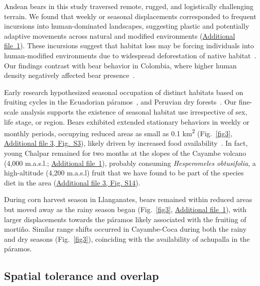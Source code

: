 \documentclass[lineno,referee,pdflatex,sn-vancouver-num]{sn-jnl}%
\theoremstyle{thmstyleone}%
\theoremstyle{thmstyletwo}%
\theoremstyle{thmstylethree}%
\begin{document}
Andean bears in this study traversed remote, rugged, and logistically challenging
terrain. We found that weekly or seasonal displacements corresponded to frequent
incursions into human-dominated landscapes, suggesting
plastic and potentially adaptive movements across natural and modified environments
(\hyperref[S1_File]{Additional file~1}). These incursions suggest that habitat loss may be forcing
individuals into human-modified environments due to widespread deforestation
of native
habitat~\cite{garcia-rangelAndeanBearTremarctos2012,kattanRangeFragmentationSpectacled2004}.
Our findings contrast with bear behavior in Colombia, where higher human density
negatively affected bear presence~\cite{gonzalez-mayaTrueHighlanderHermit2025,castrillon-hoyosOccupancyHabitatUse2023}.

Early research hypothesized seasonal occupation of distinct habitats based on fruiting
cycles in the Ecuadorian páramos~\cite{chavezSeasonalityAndeanBear2021}, and Peruvian
dry forests~\cite{suarezSeasonalDistributionFood1988}.
Our fine-scale analysis supports the existence of seasonal habitat use irrespective of sex, life stage, or region. Bears exhibited
extended stationary behaviors in weekly or monthly periods, occupying reduced areas as
small as 0.1 km\textsuperscript{2} (Fig.~\ref{fig3}, \hyperref[S3_File]{Additional file 3, Fig.~S3}),
likely driven by increased food
availability~\cite{mezziniHowResourceAbundance2025}. In fact, young Chalpar remained for two months at the slopes of the Cayambe volcano (4,000 m.a.s.l.; \hyperref[S1_File]{Additional file~1}), probably consuming \textit{Hesperomeles obtusifolia}, a high-altitude (4,200 m.a.s.l) fruit that we have found to be part of the species diet in the area (\hyperref[S3_File]{Additional file 3, Fig. S14}).

During corn harvest season in Llanganates, bears remained within reduced areas
but moved away as the rainy season began (Fig.~\ref{fig3}, \hyperref[S1_File]{Additional file~1}), with
larger displacements towards the páramos likely associated with the fruiting of
morti\~{n}o. Similar range shifts occurred in Cayambe-Coca during both the
rainy and dry seasons (Fig.~\ref{fig3}), coinciding with the availability of achupalla
in the páramos.

\subsection{Spatial tolerance and overlap}
\end{document}
